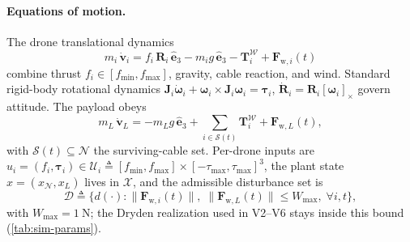 \documentclass[lettersize,journal]{IEEEtran}
\newcommand{\vect}[1]{\boldsymbol{#1}}
\newcommand{\mat}[1]{\boldsymbol{#1}}
\begin{document}
\paragraph{Equations of motion.} The drone translational dynamics
\begin{equation}
 m_i\,\dot{\vect v}_i
    = f_i\,\mat R_i\,\hat{\vect e}_3
    - m_i g\,\hat{\vect e}_3
    - \vect T_i^{\mathcal{W}}
    + \vect F_{\mathrm{w},i}(t)
  \label{eq:drone-eom}
\end{equation}
combine thrust $f_i\in[f_{\min},f_{\max}]$, gravity, cable reaction, and wind. Standard rigid-body rotational dynamics $\mat J_i\dot{\vect\omega}_i+\vect\omega_i\times\mat J_i\vect\omega_i=\vect\tau_i$, $\dot{\mat R}_i=\mat R_i[\vect\omega_i]_\times$ govern attitude. The payload obeys
\begin{equation}
 m_L\,\dot{\vect v}_L
    = -m_L g\,\hat{\vect e}_3
    + \sum_{i\in\mathcal{S}(t)} \vect T_i^{\mathcal{W}}
    + \vect F_{\mathrm{w},L}(t),
  \label{eq:payload-eom}
\end{equation}
with $\mathcal{S}(t)\subseteq\mathcal{N}$ the surviving-cable set. Per-drone inputs are $u_i=(f_i,\vect\tau_i)\in\mathcal{U}_i\triangleq[f_{\min},f_{\max}]\times[-\tau_{\max},\tau_{\max}]^3$, the plant state $x=(x_{\mathcal{N}},x_L)$ lives in $\mathcal{X}$, and the admissible disturbance set is
\begin{equation}
\label{eq:disturbance-set}
  \mathcal{D} \triangleq \bigl\{ d(\cdot) :
    \|\vect F_{\mathrm{w},i}(t)\|,\; \|\vect F_{\mathrm{w},L}(t)\|
      \le W_{\max},\;\forall i,t \bigr\},
\end{equation}
with $W_{\max}=\SI{1}{\newton}$; the Dryden realization used in V2--V6 stays inside this bound (\cref{tab:sim-params}).
\end{document}

